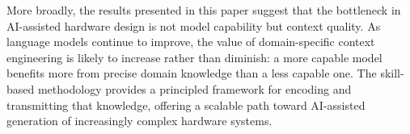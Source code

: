 \documentclass[journal]{IEEEtran}
\begin{document}
More broadly, the results presented in this paper suggest that the
bottleneck in AI-assisted hardware design is not model capability but
context quality.  As language models continue to improve, the value of
domain-specific context engineering is likely to increase rather than
diminish: a more capable model benefits more from precise domain
knowledge than a less capable one.  The skill-based methodology provides
a principled framework for encoding and transmitting that knowledge,
offering a scalable path toward AI-assisted generation of increasingly
complex hardware systems.


\clearpage


\end{document}
